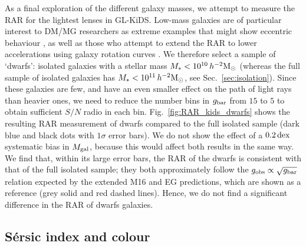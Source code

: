 \documentclass[usenatbib]{mnras}
\newcommand{\hmsun}{\,h^{-2} {\rm M_\odot}}
\newcommand{\un}[1]{_{\rm #1}}
\newcommand{\dex}{\, {\rm dex}}
\begin{document}
As a final exploration of the different galaxy masses, we attempt to measure the RAR for the lightest lenses in GL-KiDS. Low-mass galaxies are of particular interest to DM/MG researchers as extreme examples that might show eccentric behaviour \cite{oman2016,dokkum2018,guo2020}, as well as those who attempt to extend the RAR to lower accelerations using galaxy rotation curves \cite{lelli2017b,paolo2019}. We therefore select a sample of `dwarfs': isolated galaxies with a stellar mass $M_*<10^{10} \hmsun$ (whereas the full sample of isolated galaxies has $M_* < 10^{11} \hmsun$, see Sec.~\ref{sec:isolation}). Since these galaxies are few, and have an even smaller effect on the path of light rays than heavier ones, we need to reduce the number bins in $g\un{bar}$ from $15$ to $5$ to obtain sufficient $S/N$ radio in each bin. Fig.~\ref{fig:RAR_kids_dwarfs} shows the resulting RAR measurement of dwarfs compared to the full isolated sample (dark blue and black dots with $1\sigma$ error bars). We do not show the effect of a $0.2\dex$ systematic bias in $M\un{gal}$, because this would affect both results in the same way. We find that, within its large error bars, the RAR of the dwarfs is consistent with that of the full isolated sample; they both approximately follow the $g\un{obs}\propto\sqrt{g\un{bar}}$ relation expected by the extended M16 and EG predictions, which are shown as a reference (grey solid and red dashed lines). Hence, we do not find a significant difference in the RAR of dwarfs galaxies.

\subsection{S\'ersic index and colour}
\label{sec:results-types}
\end{document}
